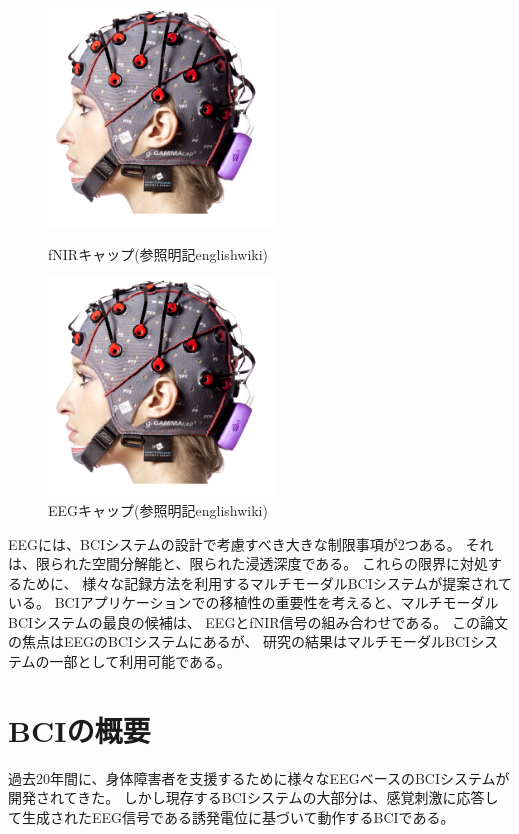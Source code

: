 \begin{figure}[t]
    \begin{minipage}{0.5\hsize}
        \begin{center}
            \includegraphics[width=60mm]{images/eeg.png}
        \end{center}
        \caption{fNIRキャップ(参照明記englishwiki)}
        \label{fig:fNIR}
    \end{minipage}
    \begin{minipage}{0.5\hsize}
        \begin{center}
            \includegraphics[width=60mm]{images/eeg.png}
        \end{center}
        \caption{EEGキャップ(参照明記englishwiki)}
        \label{fig:EEG}
    \end{minipage}
\end{figure}

EEGには、BCIシステムの設計で考慮すべき大きな制限事項が2つある。
それは、限られた空間分解能と、限られた浸透深度である。
これらの限界に対処するために、
様々な記録方法を利用するマルチモーダルBCIシステムが提案されている\cite{京大ドクター}。
BCIアプリケーションでの移植性の重要性を考えると、マルチモーダルBCIシステムの最良の候補は、
EEGとfNIR信号の組み合わせである。
この論文の焦点はEEGのBCIシステムにあるが、
研究の結果はマルチモーダルBCIシステムの一部として利用可能である。

\section{{\rm BCI}{\mc の概要}}
過去20年間に、身体障害者を支援するために様々なEEGベースのBCIシステムが開発されてきた。
しかし現存するBCIシステムの大部分は、感覚刺激に応答して生成されたEEG信号である誘発電位に基づいて動作するBCIである。
